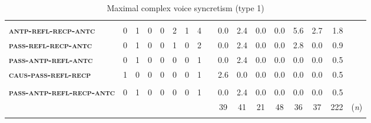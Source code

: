 \begin{sidewaystable}
\begin{tabularx}{\textwidth}{lrrrrrrrlrrrrrrrl}
		& & & & & & & & & & & & & & & & \\
		\textbf{\textsc{antp-refl-recp-antc}} & 0 & 1 & 0 & 0 & 2 & 1 & 4 & & 0.0 & 2.4 & 0.0 & 0.0 & 5.6 & 2.7 & 1.8 & \\
		\textbf{\textsc{pass-refl-recp-antc}} & 0 & 1 & 0 & 0 & 1 & 0 & 2 & & 0.0 & 2.4 & 0.0 & 0.0 & 2.8 & 0.0 & 0.9 & \\
		\textbf{\textsc{pass-antp-refl-antc}} & 0 & 1 & 0 & 0 & 0 & 0 & 1 & & 0.0 & 2.4 & 0.0 & 0.0 & 0.0 & 0.0 & 0.5 & \\
		\textbf{\textsc{caus-pass-refl-recp}} & 1 & 0 & 0 & 0 & 0 & 0 & 1 & & 2.6 & 0.0 & 0.0 & 0.0 & 0.0 & 0.0 & 0.5 & \\
		& & & & & & & & & & & & & & & & \\
		\textbf{\textsc{pass-antp-refl-recp-antc}} & 0 & 1 & 0 & 0 & 0 & 0 & 1 & & 0.0 & 2.4 & 0.0 & 0.0 & 0.0 & 0.0 & 0.5 & \\
		\midrule
		& & & & & & & & & \multicolumn{1}{c}{39} & \multicolumn{1}{c}{41} & \multicolumn{1}{c}{21} & \multicolumn{1}{c}{48} & \multicolumn{1}{c}{36} & \multicolumn{1}{c}{37} & \multicolumn{1}{c}{222} & (\textit{n}) \\
		\lspbottomrule
	\end{tabularx}
	\caption{Maximal complex voice syncretism (type 1)}
	\label{tab:ch6:voice-syncretism-maximal-complex-macroarea}
\end{sidewaystable} 

\newpage

